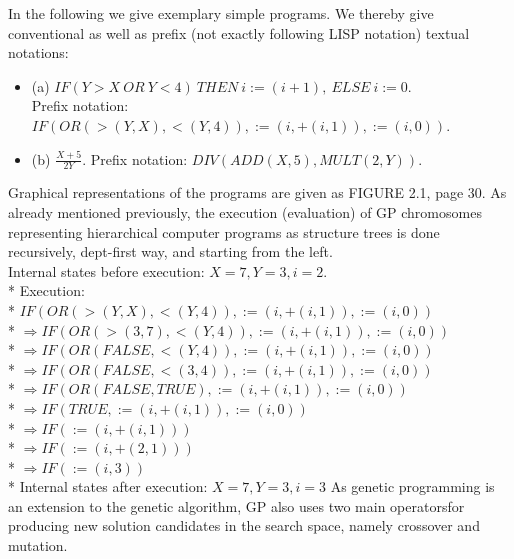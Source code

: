 \documentclass[12pt]{article}
\newcounter{subsubsubsection}[subsubsection]
\begin{document}
In the following we give exemplary simple programs. We thereby give conventional as well as prefix (not exactly following LISP notation) textual notations:
\begin{itemize}
\item (a) $IF (Y>X\ OR\ Y<4)\ THEN\ i:=(i+1),\ ELSE\ i:=0.$\\
Prefix notation: $IF(OR(>(Y,X),<(Y,4)),:=(i,+(i,1)),:=(i,0)).$
\item (b) $\frac{X+5}{2Y}.$ Prefix notation: $DIV(ADD(X,5),MULT(2,Y)).$
\end{itemize}
Graphical representations of the programs are given as FIGURE 2.1, page 30.
As already mentioned previously, the execution (evaluation) of GP chromosomes representing hierarchical computer programs as structure trees is done recursively, dept-first way, and starting from the left.\\
Internal states before execution: $X = 7, Y = 3, i = 2$.\\*
Execution:\\*
$IF(OR(>(Y,X),<(Y,4)),:=(i,+(i,1)),:=(i,0))$\\*
$\Rightarrow IF(OR(>(3,7),<(Y,4)),:=(i,+(i,1)),:=(i,0))$\\*
$\Rightarrow IF(OR(FALSE,<(Y,4)),:=(i,+(i,1)),:=(i,0))$\\*
$\Rightarrow IF(OR(FALSE,<(3,4)),:=(i,+(i,1)),:=(i,0))$\\*
$\Rightarrow IF(OR(FALSE,TRUE),:=(i,+(i,1)),:=(i,0))$\\*
$\Rightarrow IF(TRUE,:=(i,+(i,1)),:=(i,0))$\\*
$\Rightarrow IF(:=(i,+(i,1)))$\\*
$\Rightarrow IF(:=(i,+(2,1)))$\\*
$\Rightarrow IF(:=(i,3))$\\*
Internal states after execution: $X = 7, Y = 3, i = 3$
As genetic programming is an extension to the genetic algorithm, GP also uses two main operatorsfor producing new solution candidates in the search space, namely crossover and mutation.
\end{document}
